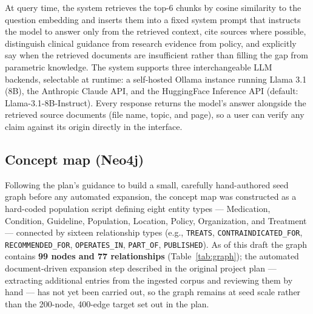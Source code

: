 \documentclass[11pt]{article}
\begin{document}
At query time, the system retrieves the top-6 chunks by cosine similarity to the question embedding and inserts them into a fixed system prompt that instructs the model to answer only from the retrieved context, cite sources where possible, distinguish clinical guidance from research evidence from policy, and explicitly say when the retrieved documents are insufficient rather than filling the gap from parametric knowledge. The system supports three interchangeable LLM backends, selectable at runtime: a self-hosted Ollama instance running Llama 3.1 (8B), the Anthropic Claude API, and the HuggingFace Inference API (default: Llama-3.1-8B-Instruct). Every response returns the model's answer alongside the retrieved source documents (file name, topic, and page), so a user can verify any claim against its origin directly in the interface.

\subsection{Concept map (Neo4j)}

Following the plan's guidance to build a small, carefully hand-authored seed graph before any automated expansion, the concept map was constructed as a hard-coded population script defining eight entity types --- Medication, Condition, Guideline, Population, Location, Policy, Organization, and Treatment --- connected by sixteen relationship types (e.g., \texttt{TREATS}, \texttt{CONTRAINDICATED\_FOR}, \texttt{RECOMMENDED\_FOR}, \texttt{OPERATES\_IN}, \texttt{PART\_OF}, \texttt{PUBLISHED}). As of this draft the graph contains \textbf{99 nodes and 77 relationships} (Table~\ref{tab:graph}); the automated document-driven expansion step described in the original project plan --- extracting additional entries from the ingested corpus and reviewing them by hand --- has not yet been carried out, so the graph remains at seed scale rather than the 200-node, 400-edge target set out in the plan.
\end{document}
